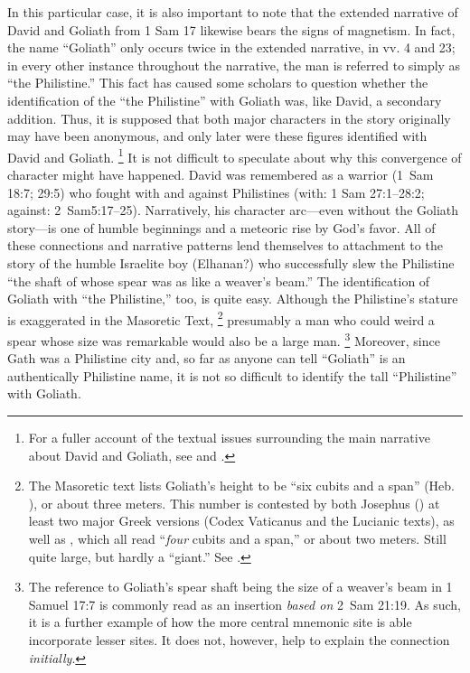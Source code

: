 In this particular case, it is also important to note that the extended narrative of David and Goliath from 1 Sam 17 likewise bears the signs of magnetism. In fact, the name ``Goliath'' only occurs twice in the extended narrative, in vv. 4 and 23; in every other instance throughout the narrative, the man is referred to simply as ``the Philistine.'' This fact has caused some scholars to question whether the identification of the ``the Philistine'' with Goliath was, like David, a secondary addition. Thus, it is supposed that both major characters in the story originally may have been anonymous, and only later were these figures identified with David and Goliath.%
    \footnote{For a fuller account of the textual issues surrounding the main narrative about David and Goliath, see \cite[280--309]{mccarter1980} and \cite[69--77]{mckenzie2000}.}
It is not difficult to speculate about why this convergence of character might have happened. David was remembered as a warrior (1~Sam 18:7; 29:5) who fought with and against Philistines (with: 1 Sam 27:1--28:2; against: 2~Sam5:17--25). Narratively, his character arc---even without the Goliath story---is one of humble beginnings and a meteoric rise by God's favor. All of these connections and narrative patterns lend themselves to attachment to the story of the humble Israelite boy (Elhanan?) who successfully slew the Philistine ``the shaft of whose spear was as like a weaver's beam.'' The identification of Goliath with ``the Philistine,'' too, is quite easy. Although the Philistine's stature is exaggerated in the Masoretic Text,%
    \footnote{The Masoretic text lists Goliath's height to be ``six cubits and a span'' (Heb. ), or about three meters. This number is contested by both Josephus () at least two major Greek versions (Codex Vaticanus and the Lucianic texts), as well as , which all read ``\emph{four} cubits and a span,'' or about two meters. Still quite large, but hardly a ``giant.'' See \cite[286]{mccarter1980}.}
presumably a man who could weird a spear whose size was remarkable would also be a large man.%
    \footnote{The reference to Goliath's spear shaft being the size of a weaver's beam in 1 Samuel 17:7 is commonly read as an insertion \emph{based on} 2~Sam 21:19. As such, it is a further example of how the more central mnemonic site is able incorporate lesser sites. It does not, however, help to explain the connection \emph{initially}.}
Moreover, since Gath was a Philistine city and, so far as anyone can tell ``Goliath'' is an authentically Philistine name,\autocite[291]{mccarter1980} it is not so difficult to identify the tall ``Philistine'' with Goliath.

